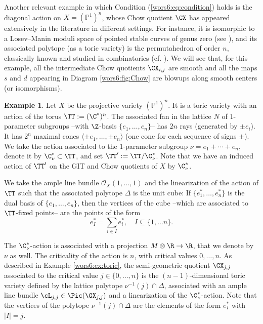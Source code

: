 \documentclass[reqno]{amsproc}
\theoremstyle{definition}
\newtheorem{example}[theorem]{Example}
\begin{document}
Another relevant example in which Condition (\ref{wors6:eq:condition}) holds is the diagonal action on  $X=(\mathbb{P}^1)^n$, whose Chow quotient $\CX$ has appeared extensively in the literature in different settings. For instance, it is isomorphic to a Losev--Manin moduli space %
of pointed stable curves of genus zero (see \cite{wors6-LS}), and its associated polytope (as a toric variety) is the permutahedron of order $n$, classically known and studied in combinatorics (cf. \cite{wors6-post}). We will see that, for this example, all the intermediate Chow quotients $\CX_{i,j}$ are smooth and all the maps $s$ and $d$  appearing in Diagram \ref{wors6:fig:Chow} are blowups along smooth centers (or isomorphisms).

\begin{example}\label{wors6:ex:perm} Let $X$ be the projective variety $(\mathbb{P}^1)^n$. It  is a toric variety with an action of the torus $\TT:=(\C^*)^n$.  
The associated fan in the lattice $N$ of $1$-parameter subgroups --with $\Z$-basis $\{e_1,\dots, e_n\}$-- has $2n$ rays (generated by  $\pm e_i$). It has $2^n$ maximal cones $\langle \pm e_1, \dots, \pm e_n\rangle$ (one cone for each sequence of signs $\pm$). We take the action associated to the $1$-parameter subgroup $\nu=e_1+\cdots+e_n$, denote it by $\C^*_\nu\subset \TT$, and set $\TT':=\TT/\C^*_\nu$. Note that we have an induced action of $\TT'$ on the GIT and Chow quotients of $X$ by $\C^*_\nu$.

    We take the ample line bundle $\mathcal{O}_X(1,\dots,1)$ and the linearization of the action of $\TT$ such that the associated polytope $\Delta$ is the unit cube:  If $\{e_1^*,\dots, e_n^*\}$ is the dual basis of $\{e_1,\dots, e_n\}$, then the vertices of the cube --which are associated to $\TT$-fixed points-- are the points of the form $$e^*_I=\sum_{i\in I} e_i^*,\quad I\subseteq\{1,\dots n\}.$$
    
    The $\C^*_\nu$-action  
    is associated with a projection $ M\otimes\R\to \R$, that we denote by $\nu$ as well. The criticality of the action is $n$, with critical values $0,\dots,n$. As described in Example \ref{wors6:ex:toric}, the semi-geometric quotient $\GX_{j,j}$ associated to the critical value $j\in\{0,\dots,n\}$ is the $(n-1)$-dimensional toric variety defined by the lattice polytope $\nu^{-1}(j)\cap \Delta$, associated with an ample line bundle $\cL_{j,j}\in \Pic(\GX_{j,j})$ and a linearization of the $\C^*_\nu$-action. Note that the vertices of the polytope $\nu^{-1}(j)\cap \Delta$ are the elements of the form $e^*_I$ with $|I|=j$.  
    

\end{example}
\end{document}
